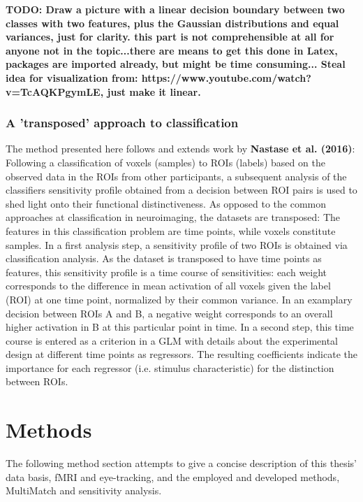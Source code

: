 \documentclass[a4paper, 12pt]{scrreprt}
\begin{document}
\textbf{TODO: Draw a picture with a linear decision boundary between two classes with two features, plus the Gaussian distributions and equal variances, just for clarity. this part is not comprehensible at all for anyone not in the topic...there are means to get this done in Latex, packages are imported already, but might be time consuming...
Steal idea for visualization from: \newline https://www.youtube.com/watch?v=TcAQKPgymLE, just make it linear.}


\subsection{A 'transposed' approach to classification}
The method presented here follows and extends work by \textbf{Nastase et al. (2016)}: Following a classification of voxels (samples) to ROIs (labels) based on the observed data in the ROIs from other participants, a subsequent analysis of the classifiers sensitivity profile obtained from a decision between ROI pairs is used to shed light onto their functional distinctiveness. As opposed to the common approaches at classification in neuroimaging, the datasets are transposed: The features in this classification problem are time points, while voxels constitute samples. \newline
In a first analysis step, a sensitivity profile of two ROIs is obtained via classification analysis. As the dataset is transposed to have time points as features, this sensitivity profile is a time course of sensitivities: each weight corresponds to the difference in mean activation of all voxels given the label (ROI) at one time point, normalized by their common variance. In an examplary decision between ROIs A and B, a negative weight corresponds to an overall higher activation in B at this particular point in time. In a second step, this time course is entered as a criterion in a GLM with details about the experimental design at different time points as regressors. The resulting coefficients indicate the importance for each regressor (i.e. stimulus characteristic) for the distinction between ROIs.


\chapter{Methods}\label{section:methods}

The following method section attempts to give a concise description of this thesis' data basis, fMRI and eye-tracking, and the employed and developed methods, MultiMatch and sensitivity analysis. 
\end{document}
